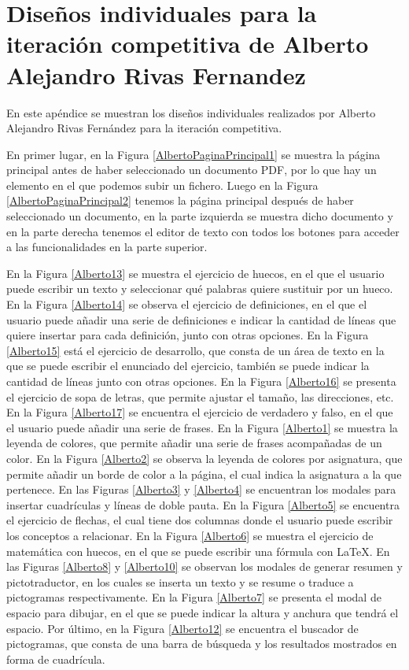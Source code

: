 \chapter{Diseños individuales para la iteración competitiva de Alberto Alejandro Rivas Fernandez}
\label{ape:disenyoAlberto}

En este apéndice se muestran los diseños individuales realizados por Alberto Alejandro Rivas Fernández para la iteración competitiva.

En primer lugar, en la Figura \ref{AlbertoPaginaPrincipal1} se muestra la página principal antes de haber seleccionado un documento PDF, por lo que hay un elemento en el que podemos subir un fichero. Luego en la Figura \ref{AlbertoPaginaPrincipal2}  tenemos la página principal después de haber seleccionado un documento, en la parte izquierda se muestra dicho documento y en la parte derecha tenemos el editor de texto con todos los botones para acceder a las funcionalidades en la parte superior. 

En la Figura \ref{Alberto13} se muestra el ejercicio de huecos, en el que el usuario puede escribir un texto y seleccionar qué palabras quiere sustituir por un hueco. En la Figura \ref{Alberto14} se observa el ejercicio de definiciones, en el que el usuario puede añadir una serie de definiciones e indicar la cantidad de líneas que quiere insertar para cada definición, junto con otras opciones. En la Figura \ref{Alberto15} está el ejercicio de desarrollo, que consta de un área de texto en la que se puede escribir el enunciado del ejercicio, también se puede indicar la cantidad de líneas junto con otras opciones. En la Figura \ref{Alberto16} se presenta el ejercicio de sopa de letras, que permite ajustar el tamaño, las direcciones, etc. En la Figura \ref{Alberto17} se encuentra el ejercicio de verdadero y falso, en el que el usuario puede añadir una serie de frases. En la Figura \ref{Alberto1} se muestra la leyenda de colores, que permite añadir una serie de frases acompañadas de un color. En la Figura \ref{Alberto2} se observa la leyenda de colores por asignatura, que permite añadir un borde de color a la página, el cual indica la asignatura a la que pertenece. En las Figuras \ref{Alberto3} y \ref{Alberto4} se encuentran los modales para insertar cuadrículas y líneas de doble pauta. En la Figura \ref{Alberto5} se encuentra el ejercicio de flechas, el cual tiene dos columnas donde el usuario puede escribir los conceptos a relacionar. En la Figura \ref{Alberto6} se muestra el ejercicio de matemática con huecos, en el que se puede escribir una fórmula con LaTeX. En las Figuras \ref{Alberto8} y \ref{Alberto10} se observan los modales de generar resumen y pictotraductor, en los cuales se inserta un texto y se resume o traduce a pictogramas respectivamente. En la Figura \ref{Alberto7} se presenta el modal de espacio para dibujar, en el que se puede indicar la altura y anchura que tendrá el espacio. Por último, en la Figura \ref{Alberto12} se encuentra el buscador de pictogramas, que consta de una barra de búsqueda y los resultados mostrados en forma de cuadrícula.



